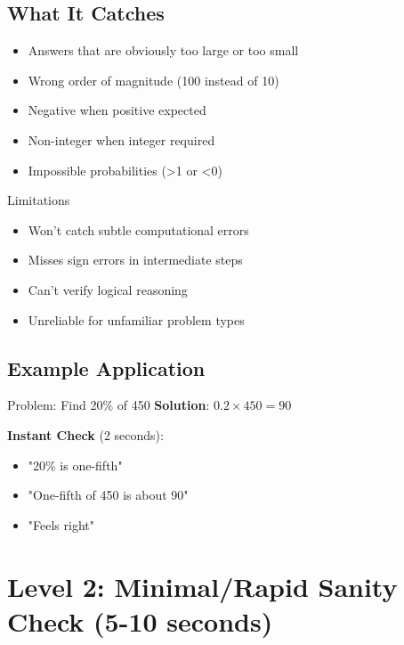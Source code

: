 \documentclass{article}
\begin{document}
\subsection{What It Catches}
\begin{itemize}
\item Answers that are obviously too large or too small
\item Wrong order of magnitude (100 instead of 10)
\item Negative when positive expected
\item Non-integer when integer required
\item Impossible probabilities (>1 or <0)
\end{itemize}

\begin{warningbox}{Limitations}
\begin{itemize}[nosep]
\item Won't catch subtle computational errors
\item Misses sign errors in intermediate steps
\item Can't verify logical reasoning
\item Unreliable for unfamiliar problem types
\end{itemize}
\end{warningbox}

\subsection{Example Application}

\begin{instantbox}{Problem: Find 20\% of 450}
\textbf{Solution}: $0.2 \times 450 = 90$

\textbf{Instant Check} (2 seconds):
\begin{itemize}[nosep]
\item "20\% is one-fifth"
\item "One-fifth of 450 is about 90"
\item "Feels right" \checkmark
\end{itemize}
\end{instantbox}

\newpage

\section{Level 2: Minimal/Rapid Sanity Check (5-10 seconds)}
\end{document}
